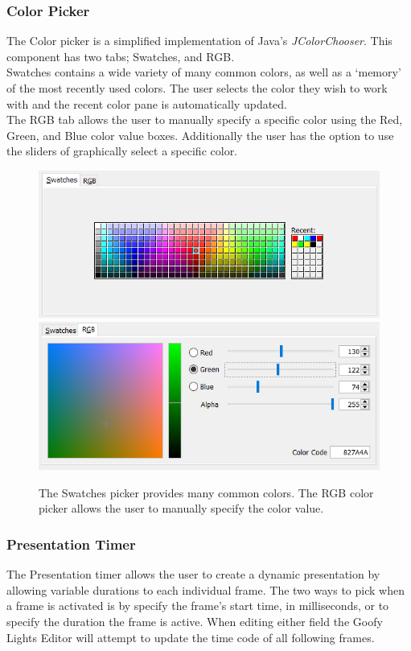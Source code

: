 \documentclass[12pt]{article}
\begin{document}
	\subsubsection {Color Picker}
  	The Color picker is a simplified implementation of Java's \textit{JColorChooser}. This component has two tabs; Swatches, and RGB.
    \\
    Swatches contains a wide variety of many common colors, as well as a `memory' of the most recently used colors. The user selects the color they wish to work with and the recent color pane is automatically updated.
    \\
    The RGB tab allows the user to manually specify a specific color using the Red, Green, and Blue color value boxes. Additionally the user has the option to use the sliders of graphically select a specific color.
    
  \begin{figure}[h]
    \centering
    \includegraphics[width=.45\linewidth]{color_swatches.png}
    \includegraphics[width=.45\linewidth]{color_RGB.png}
    \caption{
      The Swatches picker provides many common colors. The RGB color picker allows the user to manually specify the color value.
    }
  \end{figure}
  
  
	\subsubsection {Presentation Timer}
  	 The Presentation timer allows the user to create a dynamic presentation by allowing variable durations to each individual frame. The two ways to pick when a frame is activated is by specify the frame's start time, in milliseconds, or to specify the duration the frame is active. When editing either field the Goofy Lights Editor will attempt to update the time code of all following frames.
     
\end{document}
